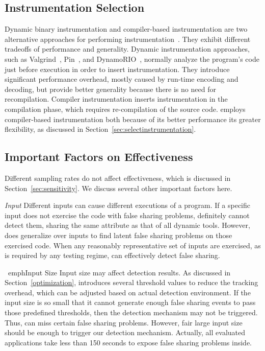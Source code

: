 \label{sec:discussion}

\subsection{Instrumentation Selection}
\label{sec:instrumentationtradeoff}
Dynamic binary instrumentation and compiler-based instrumentation are two alternative approaches for performing instrumentation~\cite{Instrumentation}. They exhibit different tradeoffs of performance and generality. Dynamic instrumentation approaches, such as Valgrind~\cite{Valgrind}, Pin~\cite{Pin}, and DynamoRIO~\cite{DynamoRIO}, normally analyze the program's code just before execution in order to insert instrumentation. They introduce significant performance overhead, mostly caused by run-time encoding and decoding, but provide better generality because there is no need for recompilation. Compiler instrumentation inserts instrumentation in the compilation phase, which requires re-compilation of the source code. 
\Predator{} employs compiler-based instrumentation both because of its better performance its greater flexibility, as discussed in Section~\ref{sec:selectinstrumentation}.

\subsection{Important Factors on Effectiveness}
Different sampling rates do not affect effectiveness, which is discussed in Section~\ref{sec:sensitivity}. We discuss several other important factors here. 

\emph{Input} Different inputs can cause different executions of a program. If a specific input does not exercise the code with false sharing problems, \Predator{} definitely cannot detect them, sharing the same attribute as that of all dynamic tools. However, \Predator{} does generalize over inputs to find latent false sharing problems on those exercised code. When any reasonably representative set of inputs are exercised, as is required by any testing regime, \Predator{} can effectively detect false sharing.

\ emph{Input Size} Input size may affect detection results.  As discussed in Section~\ref{optimization}, \Predator{} introduces several threshold values to reduce the tracking overhead, which can be adjusted based on actual detection environment. If the input size is so small that it cannot generate enough false sharing events to pass those predefined thresholds, then the detection mechanism may not be triggered. Thus, \Predator{} can miss certain false sharing problems. However, fair large input size should be enough to trigger our detection mechanism. Actually, all evaluated applications take less than 150 seconds to expose false sharing problems inside. 

